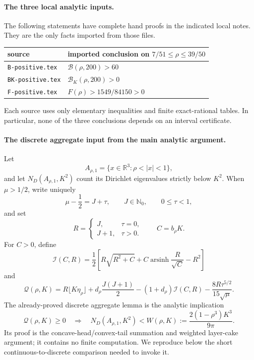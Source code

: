 \documentclass[11pt]{article}
\newcommand{\R}{\mathbb R}
\newcommand{\Bcal}{\mathcal B}
\newcommand{\Qcal}{\mathcal Q}
\newcommand{\Ical}{\mathcal I}
\begin{document}
\paragraph{The three local analytic inputs.}
The following statements have complete hand proofs in the indicated local
notes.  They are the only facts imported from those files.
\begin{center}
\begin{tabular}{l|l}
source&imported conclusion on \(7/51\leq\rho\leq39/50\)\\ \hline
\texttt{B-positive.tex}
  &\(\Bcal(\rho,200)>60\)\\
\texttt{BK-positive.tex}
  &\(\Bcal_K(\rho,200)>0\)\\
\texttt{F-positive.tex}
  &\(F(\rho)>1549/84150>0\)
\end{tabular}
\end{center}
Each source uses only elementary inequalities and finite exact-rational
tables.  In particular, none of the three conclusions depends on an
interval certificate.

\paragraph{The discrete aggregate input from the main analytic argument.}
Let
\[
 A_{\rho,1}=\{x\in\R^3:\rho<|x|<1\},
\]
and let \(N_D(A_{\rho,1},K^2)\) count its Dirichlet eigenvalues strictly
below \(K^2\).
When \(\mu>1/2\), write uniquely
\[
 \mu-\frac12=J+\tau,
 \qquad J\in\mathbb N_0,\qquad 0\leq\tau<1,
\]
and set
\[
 R=\begin{cases}J,&\tau=0,\\J+1,&\tau>0.\end{cases}
 \qquad
 C=b_\rho K.
\]
For \(C>0\), define
\[
 \Ical(C,R)=\frac12\left[
 R\sqrt{R^2+C}
 +C\operatorname{arsinh}\frac{R}{\sqrt C}
 -R^2\right]
\]
and
\begin{equation}
 \Qcal(\rho,K)
 =R\lfloor K\eta_\rho\rfloor
 +d_\rho\frac{J(J+1)}2
 -(1+d_\rho)\Ical(C,R)
 -\frac{8R\tau^{5/2}}{15\sqrt\mu}.
 \label{eq:Q}
\end{equation}
The already-proved discrete aggregate lemma is the analytic implication
\begin{equation}
 \Qcal(\rho,K)\geq0
 \quad\Longrightarrow\quad
 N_D(A_{\rho,1},K^2)
 <W(\rho,K):=\frac{2(1-\rho^3)K^3}{9\pi}.
 \label{eq:discrete-implication}
\end{equation}
Its proof is the concave-head/convex-tail summation and weighted
layer-cake argument; it contains no finite computation.  We reproduce below
the short continuous-to-discrete comparison needed to invoke it.
\end{document}
